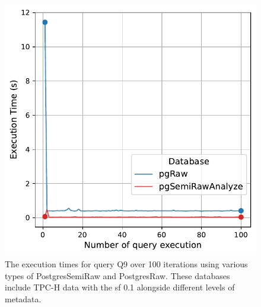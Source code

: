 \begin{figure}[hbt!]
\centering
\includegraphics[width=1.0\linewidth]{charts-eval-exp-time-stat/execution_time_db_type_Q9.pdf}
\caption[Q9:result]{The execution times for query Q9 over 100 iterations using various types of PostgresSemiRaw and PostgresRaw. These databases include TPC-H data with the \acrshort{sf} 0.1 alongside different levels of metadata.}
\label{fig:execution_time_db_type_Q9}
\end{figure}
